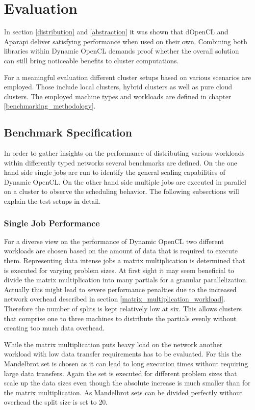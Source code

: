 \chapter{Evaluation}

In section \ref{distribution} and \ref{abstraction} it was shown that dOpenCL and Aparapi deliver satisfying performance when used on their own. Combining both libraries within Dynamic OpenCL demands proof whether the overall solution can still bring noticeable benefits to cluster computations.

For a meaningful evaluation different cluster setups based on various scenarios are employed. Those include local clusters, hybrid clusters as well as pure cloud clusters. The employed machine types and workloads are defined in chapter \ref{benchmarking_methodology}.

\section{Benchmark Specification}

In order to gather insights on the performance of distributing various workloads within differently typed networks several benchmarks are defined. On the one hand side single jobs are run to identify the general scaling capabilities of Dynamic OpenCL. On the other hand side multiple jobs are executed in parallel on a cluster to observe the scheduling behavior. The following subsections will explain the test setups in detail.

\subsection{Single Job Performance}

For a diverse view on the performance of Dynamic OpenCL two different workloads are chosen based on the amount of data that is required to execute them. Representing data intense jobs a matrix multiplication is determined that is executed for varying problem sizes. At first sight it may seem beneficial to divide the matrix multiplication into many partials for a granular parallelization. Actually this might lead to severe performance penalties due to the increased network overhead described in section \ref{matrix_multiplication_workload}. Therefore the number of splits is kept relatively low at six. This allows clusters that comprise one to three machines to distribute the partials evenly without creating too much data overhead.

While the matrix multiplication puts heavy load on the network another workload with low data transfer requirements has to be evaluated. For this the Mandelbrot set is chosen as it can lead to long execution times without requiring large data transfers. Again the set is executed for different problem sizes that scale up the data sizes even though the absolute increase is much smaller than for the matrix multiplication. As Mandelbrot sets can be divided perfectly without overhead the split size is set to 20.

